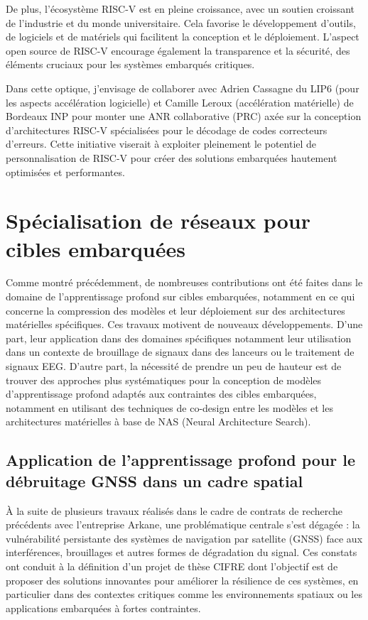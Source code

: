 \documentclass[11pt]{report}
\begin{document}
De plus, l'écosystème RISC-V est en pleine croissance, avec un soutien croissant de l'industrie et du monde universitaire. Cela favorise le développement d'outils, de logiciels et de matériels qui facilitent la conception et le déploiement. L'aspect open source de RISC-V encourage également la transparence et la sécurité, des éléments cruciaux pour les systèmes embarqués critiques.

Dans cette optique, j'envisage de collaborer avec Adrien Cassagne du LIP6 (pour les aspects accélération logicielle) et Camille Leroux (accélération matérielle) de Bordeaux INP pour monter une ANR collaborative (PRC) axée sur la conception d'architectures RISC-V spécialisées pour le décodage de codes correcteurs d'erreurs. Cette initiative viserait à exploiter pleinement le potentiel de personnalisation de RISC-V pour créer des solutions embarquées hautement optimisées et performantes.

\section{Spécialisation de réseaux pour cibles embarquées}

Comme montré précédemment, de nombreuses contributions ont été faites dans le domaine de l'apprentissage profond sur cibles embarquées, notamment en ce qui concerne la compression des modèles et leur déploiement sur des architectures matérielles spécifiques. Ces travaux motivent de nouveaux développements. D'une part, leur application dans des domaines spécifiques notamment leur utilisation dans un contexte de brouillage de signaux dans des lanceurs ou le traitement de signaux EEG. D'autre part, la nécessité de prendre un peu de hauteur est de trouver des approches plus systématiques pour la conception de modèles d'apprentissage profond adaptés aux contraintes des cibles embarquées, notamment en utilisant des techniques de co-design entre les modèles et les architectures matérielles à base de NAS (Neural Architecture Search).

\subsection{Application de l'apprentissage profond pour le débruitage GNSS dans un cadre spatial}
À la suite de plusieurs travaux réalisés dans le cadre de contrats de recherche précédents avec l'entreprise Arkane, une problématique centrale s'est dégagée : la vulnérabilité persistante des systèmes de navigation par satellite (GNSS) face aux interférences, brouillages et autres formes de dégradation du signal. Ces constats ont conduit à la définition d'un projet de thèse CIFRE dont l'objectif est de proposer des solutions innovantes pour améliorer la résilience de ces systèmes, en particulier dans des contextes critiques comme les environnements spatiaux ou les applications embarquées à fortes contraintes.
\end{document}
